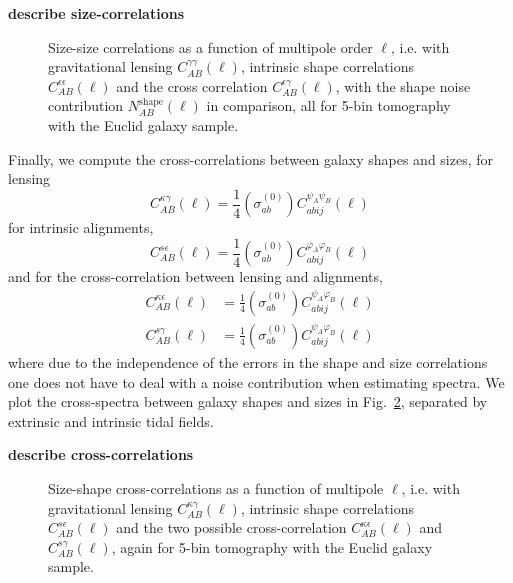 \documentclass[a4paper,fleqn,usenatbib]{mnras}
\def\spirou#1{{\bf #1}}
\begin{document}
\spirou{describe size-correlations}


\begin{figure}
\centering
\caption{Size-size correlations as a function of multipole order $\ell$, i.e. with gravitational lensing $C_{AB}^{\gamma\gamma}(\ell)$, intrinsic shape correlations $C_{AB}^{\epsilon\epsilon}(\ell)$ and the cross correlation $C_{AB}^{\epsilon\gamma}(\ell)$, with the shape noise contribution $N_{AB}^\mathrm{shape}(\ell)$ in comparison, all for 5-bin tomography with the Euclid galaxy sample.}
\label{fig:sizesize}
\end{figure}


Finally, we compute the cross-correlations between galaxy shapes and sizes, for lensing
\begin{equation}
C_{AB}^{\kappa\gamma}(\ell) = \frac{1}{4}\left(\sigma^{(0)}_{ab}\right)C^{\psi_A\psi_B}_{abij}(\ell)
\end{equation}
for intrinsic alignments,
\begin{equation}
C_{AB}^{s\epsilon}(\ell) = \frac{1}{4}\left(\sigma^{(0)}_{ab}\right)C^{\varphi_A\varphi_B}_{abij}(\ell)
\end{equation}
and for the cross-correlation between lensing and alignments,
\begin{align}
C_{AB}^{\kappa\epsilon}(\ell) & = \frac{1}{4}\left(\sigma^{(0)}_{ab}\right)C^{\psi_A\varphi_B}_{abij}(\ell)\\
C_{AB}^{s\gamma}(\ell) & = \frac{1}{4}\left(\sigma^{(0)}_{ab}\right)C^{\psi_A\varphi_B}_{abij}(\ell)
\end{align}
where due to the independence of the errors in the shape and size correlations one does not have to deal with a noise contribution when estimating spectra. We plot the cross-spectra between galaxy shapes and sizes in Fig.~\ref{fig:sizeshape}, separated by extrinsic and intrinsic tidal fields.

\spirou{describe cross-correlations}


\begin{figure}
\centering
\caption{Size-shape cross-correlations as a function of multipole $\ell$, i.e. with gravitational lensing $C_{AB}^{\kappa\gamma}(\ell)$, intrinsic shape correlations $C_{AB}^{s\epsilon}(\ell)$ and the two possible cross-correlation $C_{AB}^{\kappa\epsilon}(\ell)$ and $C_{AB}^{s\gamma}(\ell)$, again for 5-bin tomography with the Euclid galaxy sample.}
\label{fig:sizeshape}
\end{figure}
\end{document}
